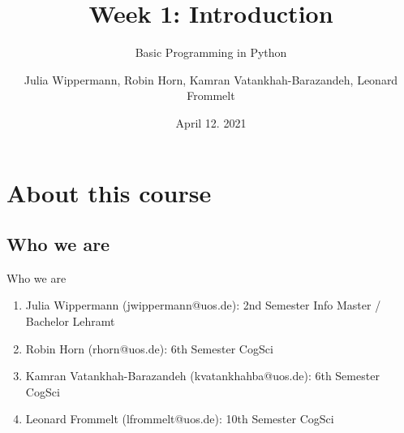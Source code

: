 
\usepackage{gensymb}
\usepackage{csquotes}
\usepackage{fontawesome}

\nocite{*}




\title[Introduction]{Week 1: Introduction}
\subtitle{Basic Programming in Python}

\author[Julia, Robin, Kamran, Leonard]{Julia Wippermann, Robin Horn, \newline Kamran Vatankhah-Barazandeh, Leonard Frommelt}

\date{April 12. 2021}

\begin{frame}[plain]
    \titlepage
\end{frame}

\begin{frame}
    \tableofcontents
\end{frame}

\section{About this course}

\subsection{Who we are}

\begin{frame}{Who we are}

    \begin{enumerate}
        \item Julia Wippermann (jwippermann@uos.de):
        \newline 2nd Semester Info Master / Bachelor Lehramt
        \newline
        \item Robin Horn (rhorn@uos.de):
        \newline 6th Semester CogSci
        \newline
        \item Kamran Vatankhah-Barazandeh (kvatankhahba@uos.de):
        \newline 6th Semester CogSci
        \newline
        \item Leonard Frommelt (lfrommelt@uos.de):
        \newline 10th Semester CogSci
    \end{enumerate}
\end{frame}

